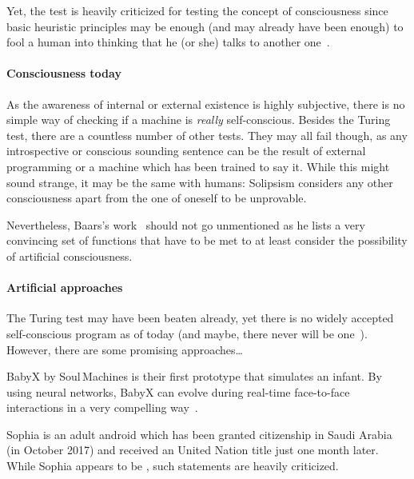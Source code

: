 Yet, the test is heavily criticized for testing the concept of consciousness since basic heuristic principles may be enough (and may already have been enough) to fool a human into thinking that he (or she) talks to another one~\cite{john1980minds}.

\paragraph{Consciousness today} As the awareness of internal or external existence is highly subjective, there is no simple way of checking if a machine is \emph{really} self-conscious. Besides the Turing test, there are a countless number of other tests. They may all fail though, as any introspective or conscious sounding sentence can be the result of external programming or a machine which has been trained to say it.
While this might sound strange, it may be the same with humans: Solipsism considers any other consciousness apart from the one of oneself to be unprovable.

Nevertheless, Baars's work~\cite{baars1993cognitive} should not go unmentioned as he lists a very convincing set of functions that have to be met to at least consider the possibility of artificial consciousness.


\paragraph{Artificial approaches}
The Turing test may have been beaten already, yet there is no widely accepted self-conscious program as of today (and maybe, there never will be one~\cite[p.~231]{Meissner2020}). However, there are some promising approaches\ldots

BabyX by Soul\,Machines is their first prototype that simulates an infant. By using neural networks, BabyX can evolve during real-time face-to-face interactions in a very compelling way~\cite{Sagar2015}.

Sophia is an adult android which has been granted citizenship in Saudi Arabia (in October 2017) and received an United Nation title just one month later. While Sophia appears to be , such statements are heavily criticized.

